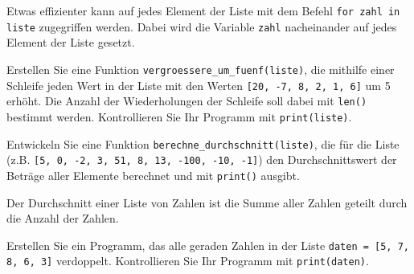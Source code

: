 \begin{myexample}
	Etwas effizienter kann auf jedes Element der Liste mit dem Befehl \lstinline|for zahl in liste| zugegriffen werden. Dabei wird die Variable \lstinline|zahl| nacheinander auf jedes Element der Liste gesetzt.
	
\end{myexample}

\begin{myexercise}
	Erstellen Sie eine Funktion \lstinline|vergroessere_um_fuenf(liste)|, die mithilfe einer Schleife jeden Wert in der Liste mit den Werten \lstinline|[20, -7, 8, 2, 1, 6]| um 5 erhöht. Die Anzahl der Wiederholungen der Schleife soll dabei mit \lstinline|len()| bestimmt werden. Kontrollieren Sie Ihr Programm mit \lstinline|print(liste)|.

	\begin{myanswer}
		
	\end{myanswer}
\end{myexercise}



\begin{myexercise}
	Entwickeln Sie eine Funktion \lstinline|berechne_durchschnitt(liste)|, die für die Liste (z.B. \lstinline|[5, 0, -2, 3, 51, 8, 13, -100, -10, -1]|) den Durchschnittswert der Beträge aller Elemente berechnet und mit \lstinline|print()| ausgibt.

	Der Durchschnitt einer Liste von Zahlen ist die Summe aller Zahlen geteilt durch die Anzahl der Zahlen.
	\begin{myanswer}
		
	\end{myanswer}
\end{myexercise}

\begin{myexercise}
	Erstellen Sie ein Programm, das alle geraden Zahlen in der Liste \lstinline|daten = [5, 7, 8, 6, 3]| verdoppelt. Kontrollieren Sie Ihr Programm mit \lstinline|print(daten)|.

	\begin{myanswer}
		
	\end{myanswer}
\end{myexercise}

